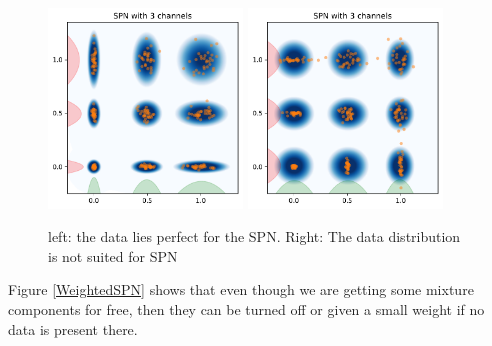 \begin{figure}[H]%
    \centering
    {\includegraphics[width=0.46\textwidth]{Pictures/SPN_illustration1.pdf} }%
    \qquad
   {\includegraphics[width=0.46\textwidth]{Pictures/SPN_illustration2.pdf} }%
    \caption{left: the data lies perfect for the SPN. Right: The data distribution
    is not suited for SPN}%
    \label{SPN_fig}%
\end{figure}

Figure \ref{WeightedSPN} shows that even though we are getting some
mixture components for free, then they can be turned off or given a small weight
if no data is present there. 

